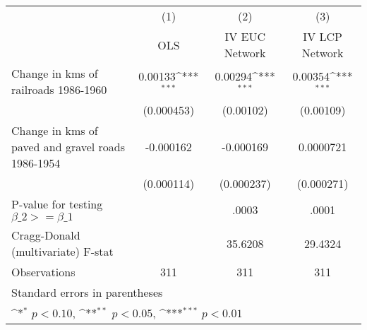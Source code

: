{
\def\sym#1{\ifmmode^{#1}\else\(^{#1}\)\fi}
\begin{tabular}{l*{3}{c}}
\hline\hline
                &\multicolumn{1}{c}{(1)}&\multicolumn{1}{c}{(2)}&\multicolumn{1}{c}{(3)}\\
                &\multicolumn{1}{c}{OLS}&\multicolumn{1}{c}{IV EUC Network}&\multicolumn{1}{c}{IV LCP Network}\\
\hline
Change in kms of railroads 1986-1960&  0.00133\sym{***}&  0.00294\sym{***}&  0.00354\sym{***}\\
                &(0.000453)         &(0.00102)         &(0.00109)         \\
[1em]
Change in kms of paved and gravel roads 1986-1954&-0.000162         &-0.000169         &0.0000721         \\
                &(0.000114)         &(0.000237)         &(0.000271)         \\
\hline
P-value for testing $\beta\_{2} >= \beta\_{1}$&                  &    .0003         &    .0001         \\
Cragg-Donald (multivariate) F-stat&                  &  35.6208         &  29.4324         \\
Observations    &      311         &      311         &      311         \\
\hline\hline
\multicolumn{4}{l}{\footnotesize Standard errors in parentheses}\\
\multicolumn{4}{l}{\footnotesize \sym{*} \(p<0.10\), \sym{**} \(p<0.05\), \sym{***} \(p<0.01\)}\\
\end{tabular}
}

